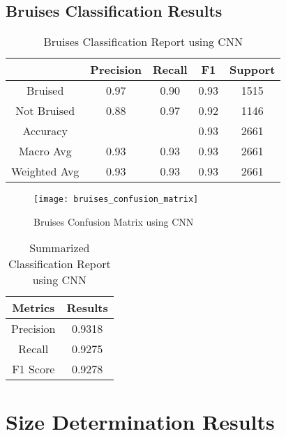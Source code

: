 \subsection{Bruises Classification Results} \label{sec:bruisesClassificationResults}

\begin{table}[htbp]
	\centering
	\begin{tabular}{c|c|c|c|c}
	  \hline
	  \textbf{ } & \textbf{Precision} & \textbf{Recall} & \textbf{F1} & \textbf{Support} \\
	  \hline
	  Bruised & 0.97 & 0.90 & 0.93 & 1515 \\
	  \hline
	  Not Bruised & 0.88 & 0.97 & 0.92 & 1146 \\
	  \hline
	  Accuracy &  &  & 0.93 & 2661 \\
	  \hline
	  Macro Avg & 0.93 & 0.93 & 0.93 & 2661 \\
	  \hline
	  Weighted Avg & 0.93 & 0.93 & 0.93 & 2661 \\
	  \hline
	\end{tabular}
	\caption{Bruises Classification Report using CNN}
	\label{tab:bruises_classification_report}
\end{table}

\begin{figure}[!htbp]
	\centering
	\texttt{[image: bruises\_confusion\_matrix]}
	\caption{Bruises Confusion Matrix using CNN}
	\label{fig:bruises_confusion_matrix_fig}
\end{figure}

\begin{table}[htbp]
	\centering
	\begin{tabular}{c|c}
	  \hline
	  \textbf{Metrics} & \textbf{Results} \\
	  \hline
	  Precision & 0.9318 \\
	  \hline
	  Recall & 0.9275 \\
	  \hline
	  F1 Score &  0.9278 \\
	  \hline
	\end{tabular}
	\caption{Summarized Classification Report using CNN}
	\label{tab:sum_bruises_classification_report}
\end{table}


\section{Size Determination Results} \label{sec:sizeDeterminationResults}

